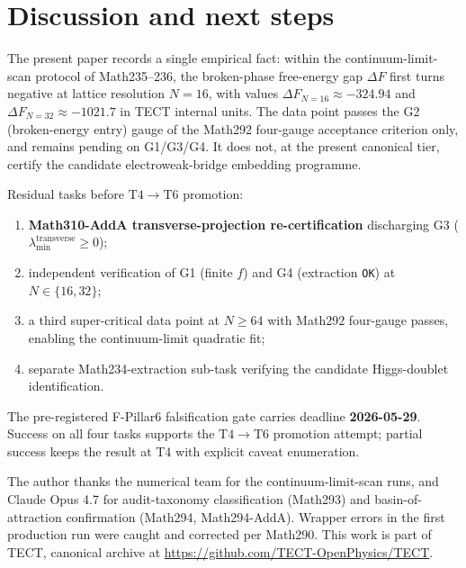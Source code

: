 \section{Discussion and next steps}\label{sec:discussion}
The present paper records a single empirical fact: within the
continuum-limit-scan protocol of Math235--236, the broken-phase
free-energy gap $\Delta F$ first turns negative at lattice resolution
$N=16$, with values $\Delta F_{N=16}\approx -324.94$ and
$\Delta F_{N=32}\approx -1021.7$ in TECT internal units. The
data point passes the G2 (broken-energy entry) gauge of the Math292
four-gauge acceptance criterion only, and remains pending on
G1/G3/G4. It does not, at the present canonical tier, certify
the candidate electroweak-bridge embedding programme.

Residual tasks before $\mathrm{T4}\to\mathrm{T6}$ promotion:
\begin{enumerate}
  \item \textbf{Math310-AddA transverse-projection re-certification}
    discharging G3 ($\lambda_{\min}^{\mathrm{transverse}}\geq 0$);
  \item independent verification of G1 (finite $f$) and G4
    (extraction \texttt{OK}) at $N\in\{16,32\}$;
  \item a third super-critical data point at $N\geq 64$ with
    Math292 four-gauge passes, enabling the continuum-limit
    quadratic fit;
  \item separate Math234-extraction sub-task verifying the candidate
    Higgs-doublet identification.
\end{enumerate}
The pre-registered F-Pillar6 falsification gate carries deadline
\textbf{2026-05-29}. Success on all four tasks supports the
$\mathrm{T4}\to\mathrm{T6}$ promotion attempt; partial success keeps
the result at T4 with explicit caveat enumeration.

\begin{acknowledgments}
The author thanks the numerical team for the continuum-limit-scan
runs, and Claude Opus 4.7 for audit-taxonomy classification (Math293)
and basin-of-attraction confirmation (Math294, Math294-AddA). Wrapper
errors in the first production run were caught and corrected per
Math290. This work is part of TECT, canonical archive at
\url{https://github.com/TECT-OpenPhysics/TECT}.
\end{acknowledgments}





